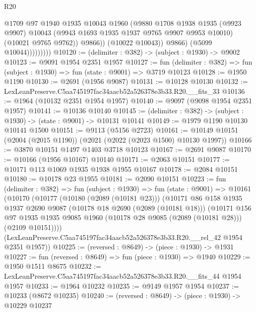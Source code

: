 \begin{lexlean}{R20}
\begin{coremodule}
                            @1709
                            @97
                            @1940
                            @1935
                            @10043
                            @1960
                            (@9880
                              @1708
                              @1938
                              @1935
                              (@9923 @9907)
                              @10043
                              (@9943 @1693 @1935 @1937 @9765 @9907 @9953 @10010)
                              (@10021 @9765 @9762))
                            @9866))
                        (@10022 @10043))
                      @9866)
                    (@5099 @10044)))))))))
@10120 := (delimiter : @382) -> (subject : @1930) -> @9002
@10123 := @9091 @1954 @2351 @1957
@10127 := fun (delimiter : @382) => fun (subject : @1930) => fun (state : @9001) => @3719 @10123
@10128 := @1950 @1190
@10130 := @2691 (@1956 @9087)
@10131 := @10128 @10130
@10132 := LexLeanPreserve.C5aa745197fac34aacb52a526378e3b33.R20.__fits_33
@10136 := @1964 (@10132 @2351 @1954 @1957)
@10140 := @9097 (@9098 @1954 @2351 @1957)
@10141 := @10136 @10140
@10145 := (delimiter : @382) -> (subject : @1930) -> (state : @9001) -> @10131 @10141
@10149 := @1979 @1190 @10130 @10141 @1500
@10151 := @9113 (@5156 @2723)
@10161 := @10149 @10151 (@2004 (@2015 @1190)) (@2021 (@2022 (@2023 @1500) @10130 @1997))
@10166 := @3870 @10151 @1497 @1403 @3718 @10123
@10167 := @2691 @9087
@10170 := @10166 (@1956 @10167) @10140
@10171 := @2063 @10151
@10177 := @10171 @113 @1069 @1935 @1938 @1955 @10167
@10178 := @2084 @10151
@10180 := @10178 @23 @1955
@10181 := @2090 @10151
@10223 := fun (delimiter : @382) =>
  fun (subject : @1930) =>
  fun (state : @9001) =>
  @10161
    (@10170
      (@10177
        (@10180 (@2089 (@10181 @23)))
        (@10171
          @86
          @158
          @1935
          @1937
          @2690
          @9087
          (@10178 @18 @2690 (@2089 (@10181 @18)))
          (@10171
            @156
            @97
            @1935
            @1935
            @9085
            @1960
            (@10178 @28 @9085 (@2089 (@10181 @28)))
            (@2109 @10151))))
      (LexLeanPreserve.C5aa745197fac34aacb52a526378e3b33.R20.__rel_42 @1954 @2351 @1957))
@10225 := (reversed : @8649) -> (piece : @1930) -> @1931
@10227 := fun (reversed : @8649) => fun (piece : @1930) => @1940
@10229 := @1950 @1511 @8675
@10232 := LexLeanPreserve.C5aa745197fac34aacb52a526378e3b33.R20.__fits_44 @1954 @1957
@10233 := @1964 @10232
@10235 := @9149 @1957 @1954
@10237 := @10233 (@8672 @10235)
@10240 := (reversed : @8649) -> (piece : @1930) -> @10229 @10237

\end{coremodule}
\end{lexlean}
